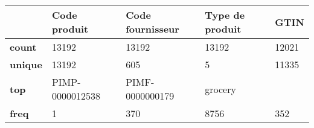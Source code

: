 \begin{tabularx}{\linewidth}{lXXXX}
\toprule
{} &     Code produit & Code fournisseur & Type de produit &   GTIN \\
\midrule
\textbf{count } &            13192 &            13192 &           13192 &  12021 \\
\textbf{unique} &            13192 &              605 &               5 &  11335 \\
\textbf{top   } &  PIMP-0000012538 &  PIMF-0000000179 &         grocery &        \\
\textbf{freq  } &                1 &              370 &            8756 &    352 \\
\bottomrule
\end{tabularx}
